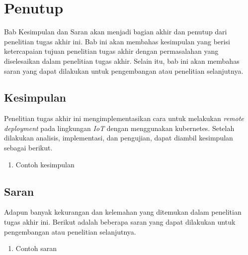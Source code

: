 \chapter{Penutup}

Bab Kesimpulan dan Saran akan menjadi bagian akhir dan penutup dari penelitian tugas akhir ini. Bab ini akan membahas kesimpulan yang berisi ketercapaian tujuan penelitian tugas akhir dengan permasalahan yang diselesaikan dalam penelitian tugas akhir. Selain itu, bab ini akan membahas saran yang dapat dilakukan untuk pengembangan atau penelitian selanjutnya.

\section{Kesimpulan}
Penelitian tugas akhir ini mengimplementasikan cara untuk melakukan \textit{remote deployment} pada lingkungan \textit{IoT} dengan menggunakan kubernetes. Setelah dilakukan analisis, implementasi, dan pengujian, dapat diambil kesimpulan sebagai berikut.
\begin{enumerate}
  \item Contoh kesimpulan
\end{enumerate}

\section{Saran}
Adapun banyak kekurangan dan kelemahan yang ditemukan dalam penelitian tugas akhir ini. Berikut adalah beberapa saran yang dapat dilakukan untuk pengembangan atau penelitian selanjutnya.
\begin{enumerate}
  \item Contoh saran
\end{enumerate}